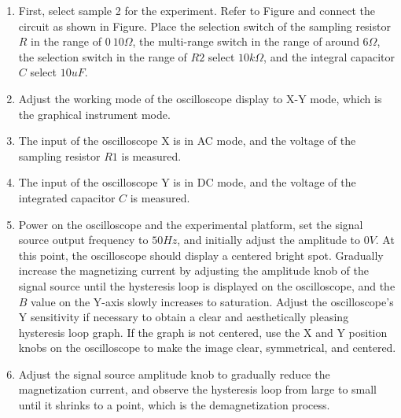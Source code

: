 \documentclass[UTF8]{article}
\begin{document}
	\begin{enumerate}
	    \item First, select sample 2 for the experiment. Refer to Figure and connect the circuit as shown in Figure. Place the selection switch of the sampling resistor \(R\) in the range of \(0~10\Omega\), the multi-range switch in the range of around \(6\Omega\), the selection switch in the range of \(R2\) select \(10k\Omega\), and the integral capacitor \(C\) select \(10uF\).
	    
	    \item Adjust the working mode of the oscilloscope display to X-Y mode, which is the graphical instrument mode.
	    
	    \item The input of the oscilloscope X is in AC mode, and the voltage of the sampling resistor \(R1\) is measured.
	    
	    \item The input of the oscilloscope Y is in DC mode, and the voltage of the integrated capacitor \(C\) is measured.
	    
	    \item Power on the oscilloscope and the experimental platform, set the signal source output frequency to \(50Hz\), and initially adjust the amplitude to \(0V\). At this point, the oscilloscope should display a centered bright spot. Gradually increase the magnetizing current by adjusting the amplitude knob of the signal source until the hysteresis loop is displayed on the oscilloscope, and the \(B\) value on the Y-axis slowly increases to saturation. Adjust the oscilloscope's Y sensitivity if necessary to obtain a clear and aesthetically pleasing hysteresis loop graph. If the graph is not centered, use the X and Y position knobs on the oscilloscope to make the image clear, symmetrical, and centered.
	    
	    \item Adjust the signal source amplitude knob to gradually reduce the magnetization current, and observe the hysteresis loop from large to small until it shrinks to a point, which is the demagnetization process.
	\end{enumerate}
	
\end{document}
